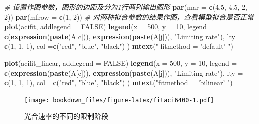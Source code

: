 \documentclass[
]{krantz}
\makeatletter
\newenvironment{Shaded}{\begin{snugshade}}{\end{snugshade}}
\newcommand{\CommentTok}[1]{\textcolor[rgb]{0.56,0.35,0.01}{\textit{#1}}}
\newcommand{\DataTypeTok}[1]{\textcolor[rgb]{0.13,0.29,0.53}{#1}}
\newcommand{\DecValTok}[1]{\textcolor[rgb]{0.00,0.00,0.81}{#1}}
\newcommand{\FloatTok}[1]{\textcolor[rgb]{0.00,0.00,0.81}{#1}}
\newcommand{\KeywordTok}[1]{\textcolor[rgb]{0.13,0.29,0.53}{\textbf{#1}}}
\newcommand{\NormalTok}[1]{#1}
\newcommand{\OtherTok}[1]{\textcolor[rgb]{0.56,0.35,0.01}{#1}}
\newcommand{\StringTok}[1]{\textcolor[rgb]{0.31,0.60,0.02}{#1}}
\newenvironment{kframe}{%
\medskip{}
\setlength{\fboxsep}{.8em}
 \def\at@end@of@kframe{}%
 \ifinner\ifhmode%
  \def\at@end@of@kframe{\end{minipage}}%
  \begin{minipage}{\columnwidth}%
 \fi\fi%
 \def\FrameCommand##1{\hskip\@totalleftmargin \hskip-\fboxsep
 \colorbox{shadecolor}{##1}\hskip-\fboxsep
     \hskip-\linewidth \hskip-\@totalleftmargin \hskip\columnwidth}%
 \MakeFramed {\advance\hsize-\width
   \@totalleftmargin\z@ \linewidth\hsize
   \@setminipage}}%
 {\par\unskip\endMakeFramed%
 \at@end@of@kframe}
\renewenvironment{Shaded}{\begin{kframe}}{\end{kframe}}
\makeatother
\begin{document}
\begin{Shaded}
\begin{Highlighting}[]
\CommentTok{# 设置作图参数，图形的边距及分为1行两列输出图形}
\KeywordTok{par}\NormalTok{(}\DataTypeTok{mar =} \KeywordTok{c}\NormalTok{(}\FloatTok{4.5}\NormalTok{, }\FloatTok{4.5}\NormalTok{, }\DecValTok{2}\NormalTok{, }\DecValTok{2}\NormalTok{))}
\KeywordTok{par}\NormalTok{(}\DataTypeTok{mfrow =} \KeywordTok{c}\NormalTok{(}\DecValTok{1}\NormalTok{, }\DecValTok{2}\NormalTok{))}
\CommentTok{# 对两种拟合参数的结果作图，查看模型拟合是否正常}
\KeywordTok{plot}\NormalTok{(acifit, }\DataTypeTok{addlegend =} \OtherTok{FALSE}\NormalTok{)}
\KeywordTok{legend}\NormalTok{(}\DataTypeTok{x =} \DecValTok{500}\NormalTok{, }\DataTypeTok{y =} \DecValTok{10}\NormalTok{, }
       \DataTypeTok{legend =} \KeywordTok{c}\NormalTok{(}\KeywordTok{expression}\NormalTok{(}\KeywordTok{paste}\NormalTok{(A[c])), }
                \KeywordTok{expression}\NormalTok{(}\KeywordTok{paste}\NormalTok{(A[j])),}
                \StringTok{"Limiting rate"}\NormalTok{),}
       \DataTypeTok{lty =} \KeywordTok{c}\NormalTok{(}\DecValTok{1}\NormalTok{, }\DecValTok{1}\NormalTok{, }\DecValTok{1}\NormalTok{),}
       \DataTypeTok{col =}\KeywordTok{c}\NormalTok{(}\StringTok{"red"}\NormalTok{, }\StringTok{"blue"}\NormalTok{, }\StringTok{"black"}\NormalTok{) }
\NormalTok{         )}
\KeywordTok{mtext}\NormalTok{(}\StringTok{" fitmethod = 'default' "}\NormalTok{)}

\KeywordTok{plot}\NormalTok{(acifit_linear, }\DataTypeTok{addlegend =} \OtherTok{FALSE}\NormalTok{)}
\KeywordTok{legend}\NormalTok{(}\DataTypeTok{x =} \DecValTok{500}\NormalTok{, }\DataTypeTok{y =} \DecValTok{10}\NormalTok{, }
       \DataTypeTok{legend =} \KeywordTok{c}\NormalTok{(}\KeywordTok{expression}\NormalTok{(}\KeywordTok{paste}\NormalTok{(A[c])), }
                  \KeywordTok{expression}\NormalTok{(}\KeywordTok{paste}\NormalTok{(A[j])),}
                  \StringTok{"Limiting rate"}\NormalTok{),}
       \DataTypeTok{lty =} \KeywordTok{c}\NormalTok{(}\DecValTok{1}\NormalTok{, }\DecValTok{1}\NormalTok{, }\DecValTok{1}\NormalTok{),}
       \DataTypeTok{col =}\KeywordTok{c}\NormalTok{(}\StringTok{"red"}\NormalTok{, }\StringTok{"blue"}\NormalTok{, }\StringTok{"black"}\NormalTok{) }
\NormalTok{)}
\KeywordTok{mtext}\NormalTok{(}\StringTok{"fitmethod = 'bilinear' "}\NormalTok{)}
\end{Highlighting}
\end{Shaded}

\begin{figure}
\centering
\texttt{[image: bookdown\_files/figure-latex/fitaci6400-1.pdf]}
\caption{\label{fig:fitaci6400}光合速率的不同的限制阶段}
\end{figure}
\end{document}
